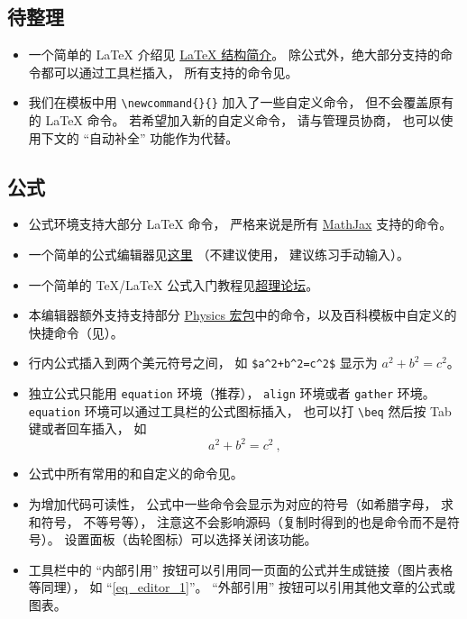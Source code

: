 \subsection{待整理}

\begin{itemize}
\item 一个简单的 LaTeX 介绍见 \href{https://wuli.wiki/online/latxIn.html}{LaTeX 结构简介}。 除公式外，绝大部分支持的命令都可以通过工具栏插入， 所有支持的命令见。
\item 我们在模板中用 \verb|\newcommand{}{}| 加入了一些自定义命令， 但不会覆盖原有的 LaTeX 命令。 若希望加入新的自定义命令， 请与管理员协商， 也可以使用下文的 “自动补全” 功能作为代替。
\end{itemize}

\subsection{公式}
\begin{itemize}
\item 公式环境支持大部分 LaTeX 命令， 严格来说是所有 \href{https://www.mathjax.org/}{MathJax} 支持的命令。
\item 一个简单的公式编辑器见\href{https://www.codecogs.com/latex/eqneditor.php}{这里} （不建议使用， 建议练习手动输入）。
\item 一个简单的 TeX/LaTeX 公式入门教程见\href{https://chaoli.club/index.php/211}{超理论坛}。
\item 本编辑器额外支持支持部分 \href{http://mirrors.ibiblio.org/CTAN/macros/latex/contrib/physics/physics.pdf}{Physics 宏包}中的命令，以及百科模板中自定义的快捷命令（见）。
\item 行内公式插入到两个美元符号之间， 如 \verb|$a^2+b^2=c^2$| 显示为 $a^2 + b^2 = c^2$。
\item 独立公式只能用 \verb|equation| 环境（推荐）， \verb|align| 环境或者 \verb|gather| 环境。 \verb|equation| 环境可以通过工具栏的公式图标插入， 也可以打 \verb|\beq| 然后按 Tab 键或者回车插入， 如
\begin{equation}\label{eq_editor_1}
a^2 + b^2 = c^2~,
\end{equation}
\item 公式中所有常用的和自定义的命令见。
\item 为增加代码可读性， 公式中一些命令会显示为对应的符号（如希腊字母， 求和符号， 不等号等）， 注意这不会影响源码（复制时得到的也是命令而不是符号）。 设置面板（齿轮图标）可以选择关闭该功能。
\item 工具栏中的 “内部引用” 按钮可以引用同一页面的公式并生成链接（图片表格等同理）， 如 “\autoref{eq_editor_1}”。 “外部引用” 按钮可以引用其他文章的公式或图表。
\end{itemize}

